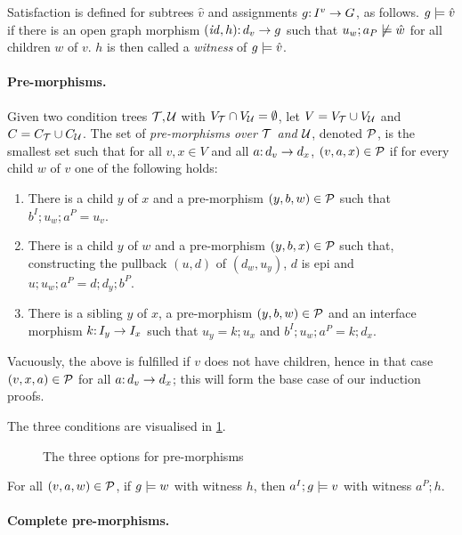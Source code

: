 Satisfaction is defined for subtrees $\hat v$ and assignments $g{:}\, I^v\rightarrow G$, as follows. $g\models \hat v$ if there is an open graph morphism $({\mathit{id}},h){:}\, d_v\rightarrow g$ such that $u_w;a_P\not\models \hat w$ for all children $w$ of $v$. $h$ is then called a \emph{witness} of $g\models \hat v$.

\paragraph{Pre-morphisms.}

Given two condition trees ${\mathcal{T}},{\mathcal{U}}$ with $V_{\mathcal{T}}\cap V_{\mathcal{U}}=\emptyset$, let $V=V_{\mathcal{T}}\cup V_{\mathcal{U}}$ and $C=C_{\mathcal{T}}\cup C_{\mathcal{U}}$. The set of \emph{pre-morphisms over ${\mathcal{T}}$ and ${\mathcal{U}}$}, denoted ${\mathcal{P}}$, is the smallest set such that for all $v,x\in V$ and all $a{:}\, d_v\rightarrow d_x$, $(v,a,x)\in {\mathcal{P}}$ if for every child $w$ of $v$ one of the following holds:

\begin{enumerate}[label=(\alph*)]
\item There is a child $y$ of $x$ and a pre-morphism $(y,b,w)\in{\mathcal{P}}$ such that $b^I;u_w;a^P=u_v$.
\item There is a child $y$ of $w$ and a pre-morphism $(y,b,x)\in{\mathcal{P}}$ such that, constructing the pullback $(u,d)$ of $(d_w,u_y)$, $d$ is epi and $u;u_w;a^P=d;d_y;b^P$.
\item There is a sibling $y$ of $x$, a pre-morphism $(y,b,w)\in{\mathcal{P}}$ and an interface morphism $k{:}\, I_y\rightarrow I_x$ such that $u_y=k;u_x$ and $b^I;u_w;a^P=k;d_x$.
\end{enumerate}
%
Vacuously, the above is fulfilled if $v$ does not have children, hence in that case $(v,x,a)\in {\mathcal{P}}$ for all $a{:}\, d_v\rightarrow d_x$; this will form the base case of our induction proofs.

The three conditions are visualised in \cref{fig:satisfaction-conditions}.

\begin{figure}

\caption{The three options for pre-morphisms}
\label{fig:satisfaction-conditions}
\end{figure}

\begin{proposition}
For all $(v,a,w)\in {\mathcal{P}}$, if $g\models w$ with witness $h$, then $a^I;g\models v$ with witness $a^P;h$.
\end{proposition}

\paragraph{Complete pre-morphisms.}

